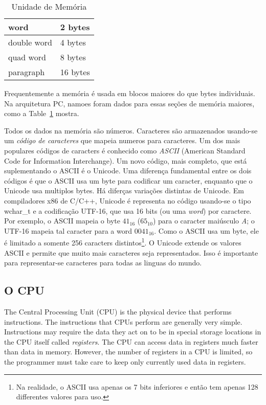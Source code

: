 \begin{table}
\begin{center}
\begin{tabular}{|l|l|}
\hline
word & 2 bytes \\ \hline
double word & 4 bytes \\ \hline
quad word & 8 bytes \\ \hline
paragraph & 16 bytes \\ \hline
\end{tabular}
\caption{ Unidade de Memória \label{tab:mem_units} }
\end{center}
\end{table}

Frequentemente a memória é usada em blocos maiores do que bytes individuais. 
Na arquitetura PC, namoes foram dados para essas seções de memória maiores, 
como a Table~\ref{tab:mem_units} mostra.

Todos os dados na memória são números. Caracteres são armazenados usando-se um 
\emph{código de caracteres} que mapeia numeros para caracteres. Um dos mais 
populares códigos de caracters é conhecido como \emph{ASCII} (American 
Standard Code for Information Interchange). Um novo código, mais completo, que 
está suplementando o ASCII é o Unicode. Uma diferença fundamental entre os 
dois códigos é que o ASCII usa um byte para codificar um caracter, enquanto 
que o Unicode usa multiplos bytes. Há diferças variações distintas de 
Unicode. Em compiladores x86 de C/C++, Unicode é representa no código 
usando-se o tipo {\code wchar\_t} e a codificação UTF-16, que usa 16 bits (ou 
uma \emph{word}) por caractere. Por exemplo, o ASCII mapeia o byte $41_{16}$ 
($65_{10}$) para o caracter maiúsculo \emph{A}; o UTF-16 mapeia tal caracter 
para a word $0041_{16}$. Como o ASCII usa um byte, ele é limitado a somente 
256 caracters distintos\footnote{Na realidade, o ASCII usa apenas os 7 bits 
inferiores e então tem apenas 128 differentes valores para uso.}. O Unicode 
extende os valores ASCII e permite que muito mais caracteres seja 
representados. Isso é importante para representar-se caracteres para todas as 
linguas do mundo.

\subsection{O CPU}

The Central Processing Unit (CPU) is the physical device that performs
instructions. The instructions that CPUs perform are generally very
simple. Instructions may require the data they act on to be in special
storage locations in the CPU itself called
\emph{registers}.  The CPU can access data in registers
much faster than data in memory. However, the number of registers in a
CPU is limited, so the programmer must take care to keep only
currently used data in registers.

